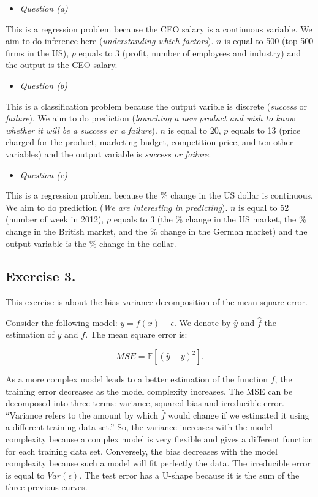\documentclass[]{book}
\providecommand{\tightlist}{%
  \setlength{\itemsep}{0pt}\setlength{\parskip}{0pt}}
\begin{document}
\begin{itemize}
\tightlist
\item
  \emph{Question (a)}
\end{itemize}

This is a regression problem because the CEO salary is a continuous variable. We aim to do inference here (\emph{understanding which factors}). \(n\) is equal to 500 (top 500 firms in the US), \(p\) equals to 3 (profit, number of employees and industry) and the output is the CEO salary.

\begin{itemize}
\tightlist
\item
  \emph{Question (b)}
\end{itemize}

This is a classification problem because the output varible is discrete (\emph{success} or \emph{failure}). We aim to do prediction (\emph{launching a new product and wish to know whether it will be a success or a failure}). \(n\) is equal to 20, \(p\) equals to 13 (price charged for the product, marketing budget, competition price, and ten other variables) and the output variable is \emph{success or failure}.

\begin{itemize}
\tightlist
\item
  \emph{Question (c)}
\end{itemize}

This is a regression problem because the \% change in the US dollar is continuous. We aim to do prediction (\emph{We are interesting in predicting}). \(n\) is equal to 52 (number of week in 2012), \(p\) equals to 3 (the \% change in the US market, the \% change in the British market, and the \% change in the German market) and the output variable is the \% change in the dollar.

\hypertarget{exercise-3.}{%
\subsection{Exercise 3.}\label{exercise-3.}}

This exercise is about the bias-variance decomposition of the mean square error.

Consider the following model: \(y = f(x) + \epsilon\). We denote by \(\widehat{y}\) and \(\widehat{f}\) the estimation of \(y\) and \(f\). The mean square error is:

\[MSE = \mathbb{E}\left[(\widehat{y} - y)^2\right].\]

As a more complex model leads to a better estimation of the function \(f\), the training error decreases as the model complexity increases. The MSE can be decomposed into three terms: variance, squared bias and irreducible error. ``Variance refers to the amount by which \(\widehat{f}\) would change if we estimated it using a different training data set.'' So, the variance increases with the model complexity because a complex model is very flexible and gives a different function for each training data set. Conversely, the bias decreases with the model complexity because such a model will fit perfectly the data. The irreducible error is equal to \(Var(\epsilon)\). The test error has a U-shape because it is the sum of the three previous curves.
\end{document}
